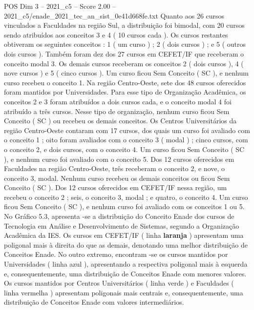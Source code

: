 \begin{textsample}{POS Dim 3 – 2021\_c5 – Score 2.00 – 2021\_c5/enade\_2021\_tec\_an\_sist\_0e41d668fe.txt}
Quanto aos 26 cursos vinculados a Faculdades na região Sul, a distribuição foi bimodal, com 20 cursos sendo atribuídos aos conceitos 3 e 4 ( 10 cursos cada ).
Os cursos restantes obtiveram os seguintes conceitos : 1 ( um curso ) ; 2 ( dois cursos ) ; e 5 ( outros dois cursos ).
Também foram dez dos 27 cursos em CEFET/IF que receberam o conceito modal 3.
Os demais cursos receberam os conceitos 2 ( dois cursos ), 4 ( nove cursos ) e 5 ( cinco cursos ).
Um curso ficou Sem Conceito ( SC ), e nenhum curso recebeu o conceito 1.
Na região Centro-Oeste, sete dos 48 cursos oferecidos foram mantidos por Universidades.
Para esse tipo de Organização Acadêmica, os conceitos 2 e 3 foram atribuídos a dois cursos cada, e o conceito modal 4 foi atribuído a três cursos.
Nesse tipo de organização, nenhum curso ficou Sem Conceito ( SC ) ou recebeu os demais conceitos.
Os Centros Universitários da região Centro-Oeste contaram com 17 cursos, dos quais um curso foi avaliado com o conceito 1 ; oito foram avaliados com o conceito 3 ( modal ) ; cinco cursos, com o conceito 2, e dois cursos, com o conceito 4.
Um curso ficou Sem Conceito ( SC ), e nenhum curso foi avaliado com o conceito 5.
Dos 12 cursos oferecidos em Faculdades na região Centro-Oeste, três receberam o conceito 2, e nove, o conceito 3, modal.
Nenhum curso recebeu os demais conceitos ou ficou Sem Conceito ( SC ).
Dos 12 cursos oferecidos em CEFET/IF nessa região, um recebeu o conceito 2 ; seis, o conceito 3, modal ; e quatro, o conceito 4.
Um curso ficou Sem Conceito ( SC ), e nenhum curso foi avaliado com os conceitos 1 ou 5.
No Gráfico 5.3, apresenta -se a distribuição do Conceito Enade dos cursos de Tecnologia em Análise e Desenvolvimento de Sistemas, segundo a Organização Acadêmica da IES.
Os cursos em CEFET/IF ( linha \textbf{laranja} ) apresentam uma poligonal mais à direita do que as demais, denotando uma melhor distribuição de Conceitos Enade.
No outro extremo, encontram -se os cursos mantidos por Universidades ( linha azul ), apresentando a respectiva poligonal mais à esquerda e, consequentemente, uma distribuição de Conceitos Enade com menores valores.
Os cursos mantidos por Centros Universitários ( linha verde ) e Faculdades ( linha vermelha ) apresentam poligonais mais centrais e, consequentemente, uma distribuição de Conceitos Enade com valores intermediários.

\end{textsample}
